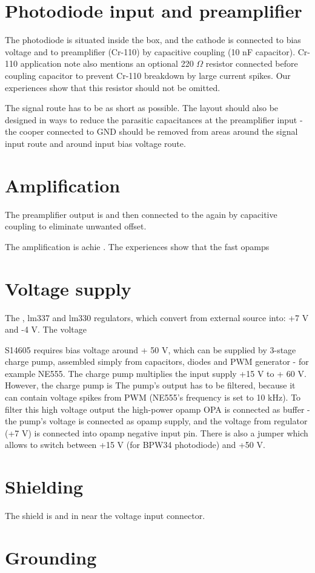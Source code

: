 \section{Photodiode input and preamplifier}
The photodiode is situated inside the box, and the cathode is connected to bias voltage and to preamplifier (Cr-110) by capacitive coupling (10 nF capacitor). Cr-110 application note also mentions an optional 220 $\Omega$ resistor connected before coupling capacitor to prevent Cr-110 breakdown by large current spikes. Our experiences show that this resistor  should not be omitted.

\par
The signal route has to be as short as possible. The layout should also be designed in ways to reduce the parasitic capacitances at the preamplifier input - the cooper connected to GND should be removed from areas around the signal input route and around input bias voltage route.

\section{Amplification}
The preamplifier output is and then connected to the again by capacitive coupling to eliminate unwanted offset. 

The amplification is achie . The experiences show that the fast opamps 

\section{Voltage supply}
The , lm337 and lm330 regulators, which convert from external source into: +7 V and -4 V. The voltage 

\par
S14605 requires bias voltage around + 50 V, which can be supplied by 3-stage charge pump, assembled simply from capacitors, diodes and PWM generator - for example NE555. The charge pump multiplies the input supply +15 V to + 60 V. However, the charge pump is  The pump's output has to be filtered, because it can contain voltage spikes from PWM (NE555's frequency is set to 10 kHz). To filter this high voltage output the high-power opamp OPA is connected as buffer - the pump's voltage is connected as opamp supply, and the voltage from regulator (+7 V) is connected into opamp negative input pin. There is also a jumper which allows to switch between +15 V (for BPW34 photodiode) and +50 V.

\section{}



\section{Shielding}

The shield is and in near the voltage input connector.

\section{Grounding}
